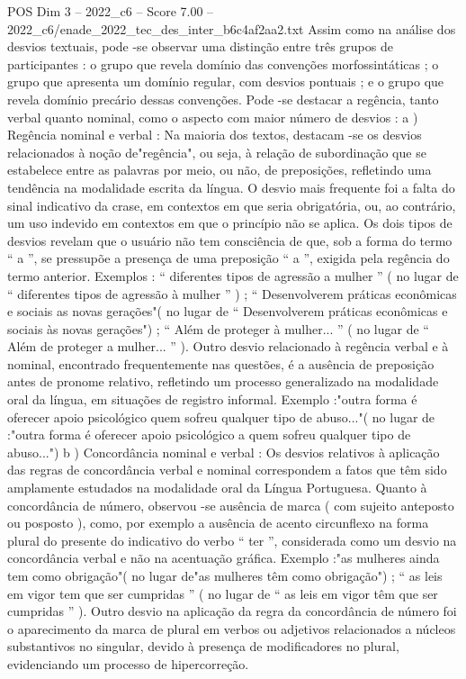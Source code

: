 \begin{textsample}{POS Dim 3 – 2022\_c6 – Score 7.00 – 2022\_c6/enade\_2022\_tec\_des\_inter\_b6c4af2aa2.txt}
Assim como na análise dos desvios textuais, pode -se observar uma distinção entre três grupos de participantes : o grupo que revela domínio das convenções morfossintáticas ; o grupo que apresenta um domínio regular, com desvios pontuais ; e o grupo que revela domínio precário dessas convenções.
Pode -se destacar a regência, tanto verbal quanto nominal, como o aspecto com maior número de desvios : a ) Regência nominal e verbal : Na maioria dos textos, destacam -se os desvios relacionados à noção de"regência", ou seja, à relação de subordinação que se estabelece entre as palavras por meio, ou não, de preposições, refletindo uma tendência na modalidade escrita da língua.
O desvio mais frequente foi a falta do sinal indicativo da crase, em contextos em que seria obrigatória, ou, ao contrário, um uso indevido em contextos em que o princípio não se aplica.
Os dois tipos de desvios revelam que o usuário não tem consciência de que, sob a forma do termo “ a ”, se pressupõe a presença de uma preposição “ a ”, exigida pela regência do termo anterior.
Exemplos : “ diferentes tipos de agressão a mulher ” ( no lugar de “ diferentes tipos de agressão à mulher ” ) ; “ Desenvolverem práticas econômicas e sociais as novas gerações"( no lugar de “ Desenvolverem práticas econômicas e sociais às novas gerações") ; “ Além de proteger à mulher... ” ( no lugar de “ Além de proteger a mulher... ” ).
Outro desvio relacionado à regência verbal e à nominal, encontrado frequentemente nas questões, é a ausência de preposição antes de pronome relativo, refletindo um processo generalizado na modalidade oral da língua, em situações de registro informal.
Exemplo :"outra forma é oferecer apoio psicológico quem sofreu qualquer tipo de abuso..."( no lugar de :"outra forma é oferecer apoio psicológico a quem sofreu qualquer tipo de abuso...") b ) Concordância nominal e verbal : Os desvios relativos à aplicação das regras de concordância verbal e nominal correspondem a fatos que têm sido amplamente estudados na modalidade oral da Língua Portuguesa.
Quanto à concordância de número, observou -se ausência de marca ( com sujeito anteposto ou posposto ), como, por exemplo a ausência de acento circunflexo na forma plural do presente do indicativo do verbo “ ter ”, considerada como um desvio na concordância verbal e não na acentuação gráfica.
Exemplo :"as mulheres ainda tem como obrigação"( no lugar de"as mulheres têm como obrigação") ; “ as leis em vigor tem que ser cumpridas ” ( no lugar de “ as leis em vigor têm que ser cumpridas ” ).
Outro desvio na aplicação da regra da concordância de número foi o aparecimento da marca de plural em verbos ou adjetivos relacionados a núcleos substantivos no singular, devido à presença de modificadores no plural, evidenciando um processo de hipercorreção.

\end{textsample}
